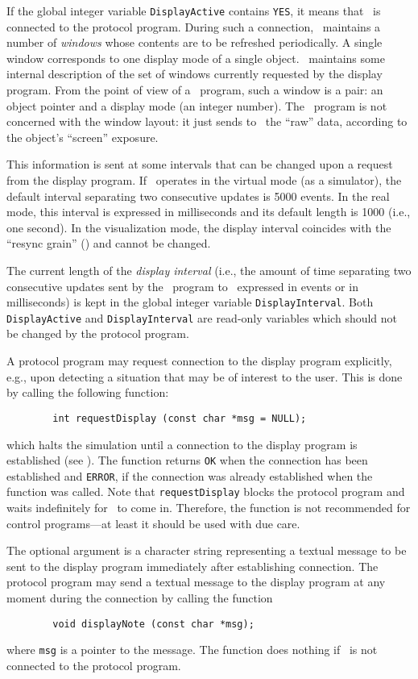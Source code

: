 If the global integer variable {\tt DisplayActive} contains {\tt YES},
it means that \dsd\ is connected to the protocol program.
During such a connection, \dsd\ maintains a number
of {\em windows\/} whose contents are to be refreshed periodically.
A single window corresponds to one display mode of a single object.
\smurph\ maintains some internal description of the set of windows
currently requested by the display program.
From the point of view of a \smurph\ program, such a window is a pair:
an object pointer and a display mode (an integer number).
The \smurph\ program is not concerned with the window layout: it just sends to
\dsd\ the ``raw'' data, according to the object's ``screen'' exposure.

This information is sent at some intervals that can be changed upon a
request from the display program.
If \smurph\ operates in the virtual mode (as a simulator), the default
interval separating two consecutive updates is 5000 events.
In the real mode, this interval is expressed in milliseconds and its default
length is 1000 (i.e., one second).
In the visualization mode, the display interval coincides with the
``resync grain'' () and cannot be changed.

The current length of the {\em display interval\/}
(i.e., the amount of time separating
two consecutive updates sent by the \smurph\ program to \dsd\ expressed
in events or in milliseconds)
is kept in the global integer variable {\tt DisplayInterval}.
Both {\tt DisplayActive} and {\tt DisplayInterval} are read-only variables
which should not be changed by the protocol program.

A protocol program may request connection to the display program explicitly,
e.g., upon detecting a situation that may be of interest to the
user.
This is done by calling the following function:
\begin{verbatim}
        int requestDisplay (const char *msg = NULL);
\end{verbatim}
which halts the simulation until a connection to the display program is
established (see ).
The function returns {\tt OK} when the connection has been established and
{\tt ERROR}, if the connection was already established when the function
was called.
Note that {\tt requestDisplay} blocks the protocol program and
waits indefinitely for \dsd\ to come in.
Therefore, the function is not recommended for control programs---at least
it should be used with due care.

The optional argument is a character string representing a textual message
to be sent to the display program immediately after establishing connection.
The protocol program may send a textual message to the display 
program at any moment during the connection by calling the function
\begin{verbatim}
        void displayNote (const char *msg);
\end{verbatim}
where {\tt msg} is a pointer to the message.
The function does nothing if \dsd\ is not connected to the protocol
program.

